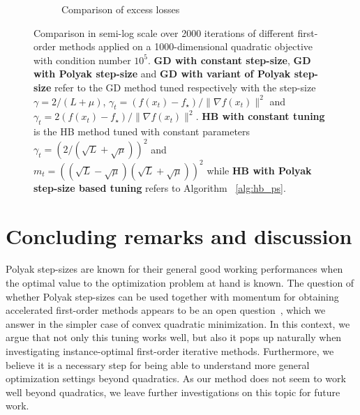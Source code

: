 \documentclass{article}
\begin{document}
\begin{figure}[H]
\begin{subfigure}[r]{.45\textwidth}
            \caption{Comparison of excess losses}
            \label{fig:quad_long_losses}
        \end{subfigure}
        \caption{Comparison in semi-log scale over 2000 iterations of different first-order methods applied on a 1000-dimensional quadratic objective with condition number $10^5$. \textbf{GD with constant step-size}, \textbf{GD with Polyak step-size} and \textbf{GD with variant of Polyak step-size} refer to the GD method tuned respectively with the step-size $\gamma = 2 / (L+\mu)$, $\gamma_t = (f(x_t) - f_\star) / \|\nabla f(x_t)\|^2$ and $\gamma_t =   2(f(x_t) - f_\star) / \|\nabla f(x_t)\|^2$. \textbf{HB with constant tuning} is the HB method tuned with constant parameters $\gamma_t = (2 / (\sqrt{L} + \sqrt{\mu}))^2$ and $m_t=((\sqrt{L} - \sqrt{\mu})(\sqrt{L} + \sqrt{\mu}))^2$ while \textbf{HB with Polyak step-size based tuning} refers to Algorithm ~\ref{alg:hb_ps}.}
        \label{fig:quad_long}
    \end{figure}

\section{Concluding remarks and discussion}\label{sec:discussion}

    Polyak step-sizes are known for their general good working performances when the optimal value to the optimization problem at hand is known.
    The question of whether Polyak step-sizes can be used together with momentum
    for obtaining accelerated first-order methods appears to be an open question~\citep{barre2020complexity},
    which we answer in the simpler case of convex quadratic minimization.
    In this context, we argue that not only this tuning works well,
    but also it pops up naturally when investigating instance-optimal first-order iterative methods.
    Furthermore, we believe it is a necessary step for being able to understand more general optimization settings beyond quadratics.
    As our method does not seem to work well beyond quadratics, we leave further investigations on this topic for future work.
\end{document}
